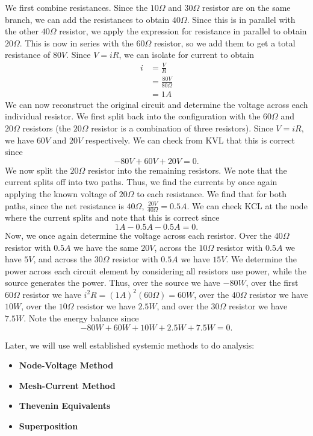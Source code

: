 \documentclass[11pt]{article}
\theoremstyle{plain} %
\theoremstyle{definition}
\theoremstyle{example}
\theoremstyle{remark}
\begin{document}
We first combine resistances. Since the $10\Omega$ and $30\Omega$ resistor are on the same branch, we can add the resistances to obtain $40\Omega$. Since this is in parallel with the other $40\Omega$ resistor, we apply the expression for resistance in parallel to obtain $20\Omega$. This is now in series with the $60\Omega$ resistor, so we add them to get a total resistance of $80V$. Since $V = iR$, we can isolate for current to obtain 
\begin{align*}
i &= \frac{V}{R}\\
&= \frac{80V}{80\Omega}\\
&= 1A
\end{align*}
We can now reconstruct the original circuit and determine the voltage across each individual resistor. We first split back into the configuration with the $60\Omega$ and $20\Omega$ resistors (the $20\Omega$ resistor is a combination of three resistors). Since $V = iR$, we have $60V$ and $20V$ respectively. We can check from KVL that this is correct since 
$$-80V+60V+20V=0.$$
We now split the $20\Omega$ resistor into the remaining resistors. We note that the current splits off into two paths. Thus, we find the currents by once again applying the known voltage of $20\Omega$ to each resistance. We find that for both paths, since the net resistance is $40\Omega$, $\frac{20V}{40\Omega} = 0.5A$. We can check KCL at the node where the current splits and note that this is correct since
$$1A-0.5A-0.5A = 0.$$
Now, we once again determine the voltage across each resistor. Over the $40\Omega$ resistor with $0.5A$ we have the same $20V$, across the $10\Omega$ resistor with $0.5A$ we have $5V$, and across the $30\Omega$ resistor with $0.5A$ we have $15V$. 
We determine the power across each circuit element by considering all resistors use power, while the source generates the power. Thus, over the source we have $-80W$, over the first $60\Omega$ resistor we have $i^2R = (1A)^2(60\Omega) = 60W$, over the $40\Omega$ resistor we have $10W$, over the $10\Omega$ resistor we have $2.5W$, and over the $30\Omega$ resistor we have $7.5W$. Note the energy balance since $$-80W + 60W + 10W + 2.5W + 7.5W = 0.$$

Later, we will use well established systemic methods to do analysis:
\begin{itemize}
	\item \textbf{Node-Voltage Method}
	\item \textbf{Mesh-Current Method}
	\item \textbf{Thevenin Equivalents}
	\item \textbf{Superposition}
\end{itemize}
\end{document}
